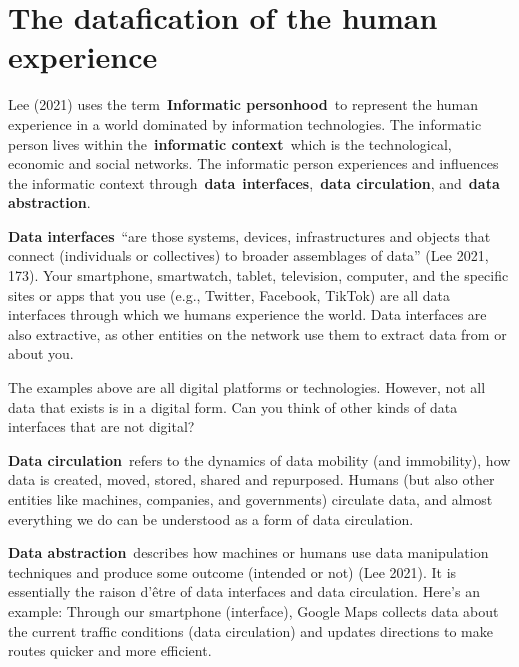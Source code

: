 \documentclass[
  letterpaper,
  DIV=11,
  numbers=noendperiod]{scrreprt}
\begin{document}
\section{The datafication of the human
experience}\label{the-datafication-of-the-human-experience}

Lee (2021) uses the term~\textbf{Informatic personhood}~to represent the
human experience in a world dominated by information technologies. The
informatic person lives within the~\textbf{informatic context}~which is
the technological, economic and social networks. The informatic person
experiences and influences the informatic context
through~\textbf{data}~\textbf{interfaces},~\textbf{data circulation},
and~\textbf{data abstraction}.

\textbf{Data interfaces}~``are those systems, devices, infrastructures
and objects that connect (individuals or collectives) to broader
assemblages of data'' (Lee 2021, 173). Your smartphone, smartwatch,
tablet, television, computer, and the specific sites or apps that you
use (e.g., Twitter, Facebook, TikTok) are all data interfaces through
which we humans experience the world. Data interfaces are also
extractive, as other entities on the network use them to extract data
from or about you.

\begin{tcolorbox}[enhanced jigsaw, arc=.35mm, bottomrule=.15mm, bottomtitle=1mm, breakable, colback=white, colbacktitle=quarto-callout-tip-color!10!white, colframe=quarto-callout-tip-color-frame, coltitle=black, left=2mm, leftrule=.75mm, opacityback=0, opacitybacktitle=0.6, rightrule=.15mm, title=\textcolor{quarto-callout-tip-color}{\faLightbulb}\hspace{0.5em}{Pause and reflect}, titlerule=0mm, toprule=.15mm, toptitle=1mm]

The examples above are all digital platforms or technologies. However,
not all data that exists is in a digital form. Can you think of other
kinds of data interfaces that are not digital?

\end{tcolorbox}

\textbf{Data circulation}~refers to the dynamics of data mobility (and
immobility), how data is created, moved, stored, shared and repurposed.
Humans (but also other entities like machines, companies, and
governments) circulate data, and almost everything we do can be
understood as a form of data circulation.

\textbf{Data abstraction}~describes how machines or humans use data
manipulation techniques and produce some outcome (intended or not) (Lee
2021). It is essentially the raison d'être of data interfaces and data
circulation. Here's an example: Through our smartphone (interface),
Google Maps collects data about the current traffic conditions (data
circulation) and updates directions to make routes quicker and more
efficient.
\end{document}

